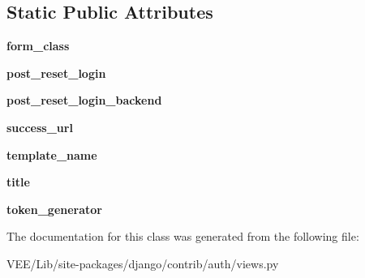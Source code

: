 \subsection*{Static Public Attributes}
\begin{DoxyCompactItemize}
\item 
\mbox{\label{classdjango_1_1contrib_1_1auth_1_1views_1_1_password_reset_confirm_view_a7a9d274de2fdf6d41e5c89882ee275ac}} 
{\bfseries form\+\_\+class}
\item 
\mbox{\label{classdjango_1_1contrib_1_1auth_1_1views_1_1_password_reset_confirm_view_a9ce0a35581ccf7481fbab6be5ebb9ea8}} 
{\bfseries post\+\_\+reset\+\_\+login}
\item 
\mbox{\label{classdjango_1_1contrib_1_1auth_1_1views_1_1_password_reset_confirm_view_a9a932974f2fefb01c1ba0230b5b988dc}} 
{\bfseries post\+\_\+reset\+\_\+login\+\_\+backend}
\item 
\mbox{\label{classdjango_1_1contrib_1_1auth_1_1views_1_1_password_reset_confirm_view_ac46555abbf7851f8120d6cc8c72a3357}} 
{\bfseries success\+\_\+url}
\item 
\mbox{\label{classdjango_1_1contrib_1_1auth_1_1views_1_1_password_reset_confirm_view_ad6ffd46387881dd3327da6fdf7fa7932}} 
{\bfseries template\+\_\+name}
\item 
\mbox{\label{classdjango_1_1contrib_1_1auth_1_1views_1_1_password_reset_confirm_view_af06c913e26306cab9020c30fe8769ce7}} 
{\bfseries title}
\item 
\mbox{\label{classdjango_1_1contrib_1_1auth_1_1views_1_1_password_reset_confirm_view_a2cec5fb35b8d89ab9077e3414caf88e6}} 
{\bfseries token\+\_\+generator}
\end{DoxyCompactItemize}


The documentation for this class was generated from the following file\+:\begin{DoxyCompactItemize}
\item 
V\+E\+E/\+Lib/site-\/packages/django/contrib/auth/views.\+py\end{DoxyCompactItemize}
